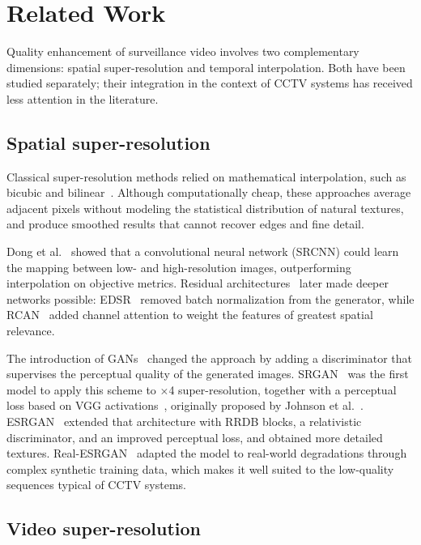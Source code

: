 \documentclass[conference]{IEEEtran}
\begin{document}
\section{Related Work}

Quality enhancement of surveillance video involves two complementary dimensions: spatial super-resolution and temporal interpolation. Both have been studied separately; their integration in the context of CCTV systems has received less attention in the literature.

\subsection{Spatial super-resolution}

Classical super-resolution methods relied on mathematical interpolation, such as bicubic and bilinear~\cite{vanouwerkerk2006survey}. Although computationally cheap, these approaches average adjacent pixels without modeling the statistical distribution of natural textures, and produce smoothed results that cannot recover edges and fine detail.

Dong et al.~\cite{dong2014srcnn} showed that a convolutional neural network (SRCNN) could learn the mapping between low- and high-resolution images, outperforming interpolation on objective metrics. Residual architectures~\cite{he2016resnet} later made deeper networks possible: EDSR~\cite{lim2017edsr} removed batch normalization from the generator, while RCAN~\cite{zhang2018rcan} added channel attention to weight the features of greatest spatial relevance.

The introduction of GANs~\cite{goodfellow2014gan} changed the approach by adding a discriminator that supervises the perceptual quality of the generated images. SRGAN~\cite{ledig2017srgan} was the first model to apply this scheme to $\times$4 super-resolution, together with a perceptual loss based on VGG activations~\cite{simonyan2015vgg}, originally proposed by Johnson et al.~\cite{johnson2016perceptual}. ESRGAN~\cite{wang2018esrgan} extended that architecture with RRDB blocks, a relativistic discriminator, and an improved perceptual loss, and obtained more detailed textures. Real-ESRGAN~\cite{wang2021realesrgan} adapted the model to real-world degradations through complex synthetic training data, which makes it well suited to the low-quality sequences typical of CCTV systems.

\subsection{Video super-resolution}
\end{document}
